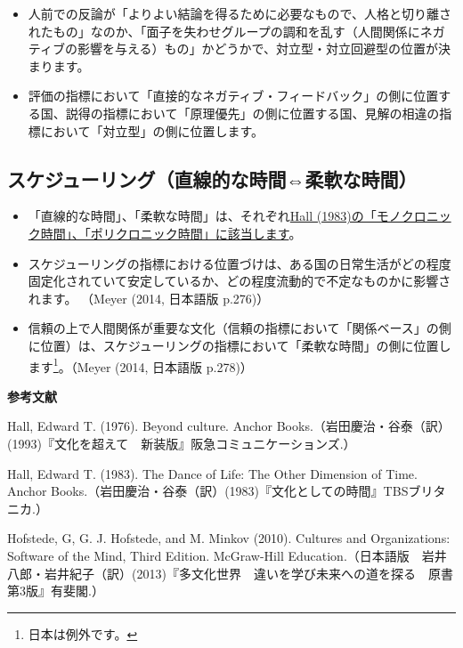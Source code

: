 \documentclass[
]{book}
\begin{document}
\begin{itemize}
\item
  人前での反論が「よりよい結論を得るために必要なもので、人格と切り離されたもの」なのか、「面子を失わせグループの調和を乱す（人間関係にネガティブの影響を与える）もの」かどうかで、対立型・対立回避型の位置が決まります。
\item
  評価の指標において「直接的なネガティブ・フィードバック」の側に位置する国、説得の指標において「原理優先」の側に位置する国、見解の相違の指標において「対立型」の側に位置します。
\end{itemize}

\hypertarget{ux30b9ux30b1ux30b8ux30e5ux30fcux30eaux30f3ux30b0ux76f4ux7ddaux7684ux306aux6642ux9593ux67d4ux8edfux306aux6642ux9593}{%
\subsection{スケジューリング（直線的な時間⇔柔軟な時間）}\label{ux30b9ux30b1ux30b8ux30e5ux30fcux30eaux30f3ux30b0ux76f4ux7ddaux7684ux306aux6642ux9593ux67d4ux8edfux306aux6642ux9593}}

\begin{itemize}
\item
  「直線的な時間」、「柔軟な時間」は、それぞれ\protect\hyperlink{hall}{Hall (1983)の「モノクロニック時間」、「ポリクロニック時間」に該当します}。
\item
  スケジューリングの指標における位置づけは、ある国の日常生活がどの程度固定化されていて安定しているか、どの程度流動的で不定なものかに影響されます。 （Meyer (2014, 日本語版 p.276)）
\item
  信頼の上で人間関係が重要な文化（信頼の指標において「関係ベース」の側に位置）は、スケジューリングの指標において「柔軟な時間」の側に位置します\footnote{日本は例外です。}。（Meyer (2014, 日本語版 p.278)）
\end{itemize}

{\textbf{参考文献}}

Hall, Edward T. (1976). Beyond culture. Anchor Books.（岩田慶治・谷泰（訳）(1993)『文化を超えて　新装版』阪急コミュニケーションズ.）

Hall, Edward T. (1983). The Dance of Life: The Other Dimension of Time. Anchor Books.（岩田慶治・谷泰（訳）(1983)『文化としての時間』TBSブリタニカ.）

Hofstede, G, G. J. Hofstede, and M. Minkov (2010). Cultures and Organizations: Software of the Mind, Third Edition. McGraw-Hill Education.（日本語版　岩井八郎・岩井紀子（訳）(2013)『多文化世界　違いを学び未来への道を探る　原書第3版』有斐閣.）
\end{document}
